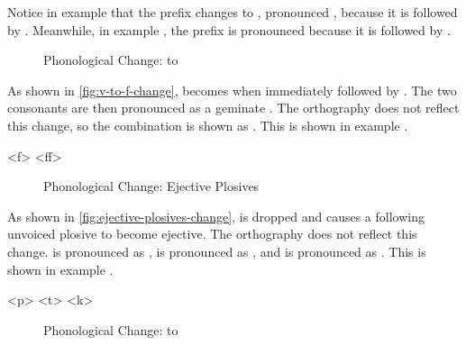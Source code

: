 Notice in example  that the prefix  changes to , pronounced , because it is followed by . Meanwhile, in example , the prefix  is pronounced  because it is followed by .

\begin{figure}[h]\centering
	\caption{Phonological Change:  to }
	\label{fig:v-to-f-change}
\end{figure}

As shown in \autoref{fig:v-to-f-change},  becomes  when immediately followed by . The two consonants are then pronounced as a geminate . The orthography does not reflect this change, so the combination is shown as . This is shown in example .

\pex[exno=\getref{assimv}]
	    
	\a<ff>    
\xe

\begin{figure}[h]\centering
	\caption{Phonological Change: Ejective Plosives}
	\label{fig:ejective-plosives-change}
\end{figure}

As shown in \autoref{fig:ejective-plosives-change},  is dropped and causes a following unvoiced plosive to become ejective. The orthography does not reflect this change.  is pronounced as ,  is pronounced as , and  is pronounced as . This is shown in example .

\pex[exno=\getref{assimt}]
	    
	    
	    
\xe

\begin{figure}[h]\centering
	\caption{Phonological Change:  to }
	\label{fig:t-to-d-change}
\end{figure}

